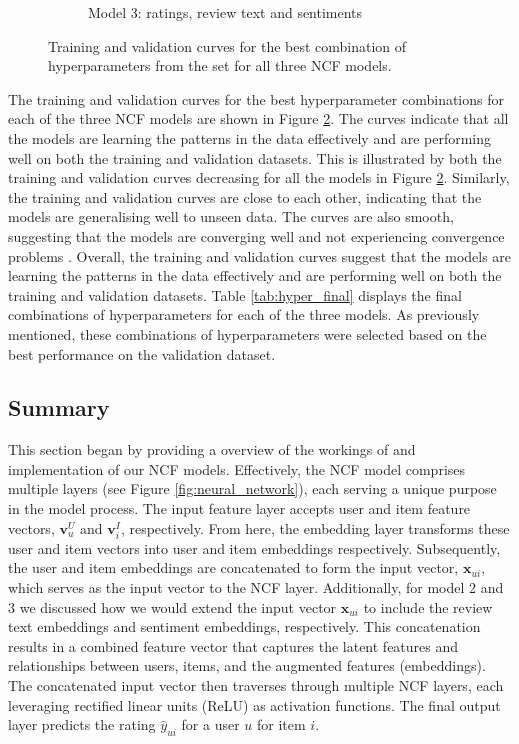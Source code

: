 \begin{figure}[h]
\begin{subfigure}{0.49\textwidth}
        \caption{Model 3: ratings, review text and sentiments}
        \label{fig:model3}
    \end{subfigure}
    \caption{Training and validation curves for the best combination of hyperparameters from the set for all three NCF models.}
    \label{fig:train_val curves final}
\end{figure}


The training and validation curves for the best hyperparameter combinations for each of the three NCF models are shown in Figure \ref{fig:train_val curves final}. The curves indicate that all the models are learning the patterns in the data effectively and are performing well on both the training and validation datasets. This is illustrated by both the training and validation curves decreasing for all the models in Figure \ref{fig:train_val curves final}. Similarly, the training and validation curves are close to each other, indicating that the models are generalising well to unseen data. The curves are also smooth, suggesting that the models are converging well and not experiencing convergence problems \cite{bergstra2011algorithms}. Overall, the training and validation curves suggest that the models are learning the patterns in the data effectively and are performing well on both the training and validation datasets. Table \ref{tab:hyper_final} displays the final combinations of hyperparameters for each of the three models. As previously mentioned, these combinations of hyperparameters were selected based on the best performance on the validation dataset. 


\subsection{Summary}
\label{sec:4 Summary for NCF}

This section began by providing a overview of the workings of and implementation of our NCF models. Effectively, the NCF model comprises multiple layers (see Figure \ref{fig:neural_network}), each serving a unique purpose in the model process. The input feature layer accepts user and item feature vectors, $\mathbf{v}_u^U$ and $\mathbf{v}_i^I$, respectively. From here, the embedding layer transforms these user and item vectors into user and item embeddings respectively. Subsequently, the user and item embeddings are concatenated to form the input vector, $\mathbf{x}_{ui}$, which serves as the input vector to the NCF layer. Additionally, for model 2 and 3 we discussed how we would extend the input vector $\mathbf{x}_{ui}$ to include the review text embeddings and sentiment embeddings, respectively. This concatenation results in a combined feature vector that captures the latent features and relationships between users, items, and the augmented features (embeddings). The concatenated input vector then traverses through multiple NCF layers, each leveraging rectified linear units (ReLU) as activation functions. The final output layer predicts the rating $\hat{y}_{u i}$ for a user $u$ for item $i$. 

